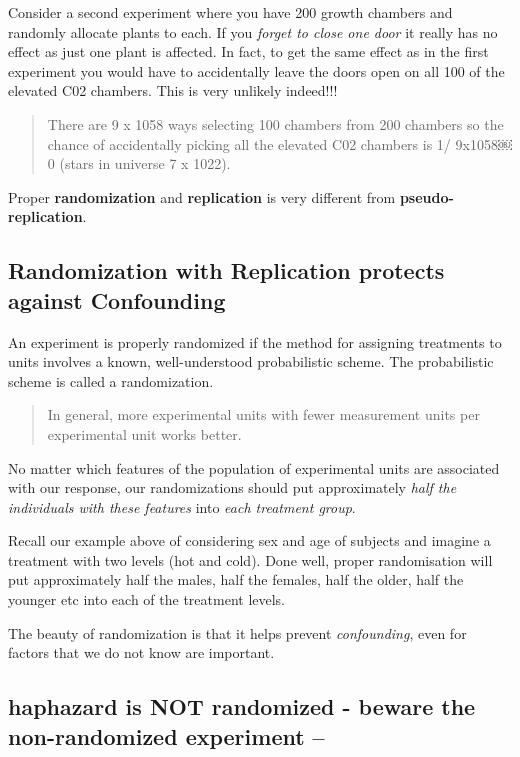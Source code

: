 \documentclass[
]{book}
\begin{document}
Consider a second experiment where you have 200 growth chambers and randomly allocate plants to each. If you \emph{forget to close one door} it really has no effect as just one plant is affected. In fact, to get the same effect as in the first experiment you would have to accidentally leave the doors open on all 100 of the elevated C02 chambers. This is very unlikely indeed!!!

\begin{quote}
There are 9 x 1058 ways selecting 100 chambers from 200 chambers so the chance of accidentally picking all the elevated C02 chambers is 1/ 9x1058￼0 (stars in universe 7 x 1022).
\end{quote}

Proper \textbf{randomization} and \textbf{replication} is very different from \textbf{pseudo-replication}.

\hypertarget{randomization-with-replication-protects-against-confounding}{%
\subsection{Randomization with Replication protects against Confounding}\label{randomization-with-replication-protects-against-confounding}}

An experiment is properly randomized if the method for assigning treatments to units involves a known, well-understood probabilistic scheme. The probabilistic scheme is called a randomization.

\begin{quote}
In general, more experimental units with fewer measurement units per experimental unit works better.
\end{quote}

No matter which features of the population of experimental units are associated with our response, our randomizations should put approximately \emph{half the individuals with these features} into \emph{each treatment group}.

Recall our example above of considering sex and age of subjects and imagine a treatment with two levels (hot and cold). Done well, proper randomisation will put approximately half the males, half the females, half the older, half the younger etc into each of the treatment levels.

The beauty of randomization is that it helps prevent \emph{confounding}, even for factors that we do not know are important.

\hypertarget{haphazard-is-not-randomized---beware-the-non-randomized-experiment}{%
\subsection{\texorpdfstring{\textbf{haphazard} is NOT randomized - beware the non-randomized experiment --}{haphazard is NOT randomized - beware the non-randomized experiment --}}\label{haphazard-is-not-randomized---beware-the-non-randomized-experiment}}
\end{document}
